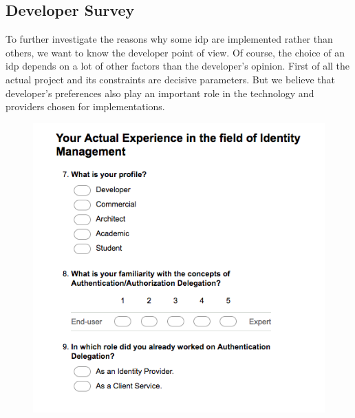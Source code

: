 \subsection{Developer Survey}
\label{sec:devsurvey}
To further investigate the reasons why some \gls{idp} are implemented rather than others, we want to know the developer point of view.
Of course, the choice of an \gls{idp} depends on a lot of other factors than the developer's opinion.
First of all the actual project and its constraints are decisive parameters.
But we believe that developer's preferences also play an important role in the technology and providers chosen for implementations.

\begin{figure}
    \includegraphics[scale=0.55, angle =90 ]{images/surveyBzhCamp2}

\end{figure}
